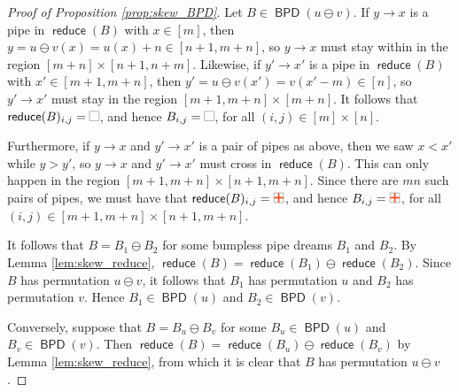 \documentclass[11pt]{article}
\theoremstyle{definition}
\numberwithin{equation}{section}
\DeclareMathOperator{\reduce}{\mathsf{reduce}}
\DeclareMathOperator{\BPD}{\mathsf{BPD}}
\newcommand{\pipecolor}{UForange}
\newcommand{\tilescale}{0.27}
\newcommand{\drawSquare}{
    \draw[
        xshift=0.5cm,yshift=0.5cm,
        black,opacity=0.5,thin
    ] (0,0) rectangle (1,1);
}
\newcommand{\drawHorizontal}[2]{
    \draw[color=\pipecolor,very thick]
    (#1-0.5,#2) to (#1+0.5,#2);
}
\newcommand{\drawVertical}[2]{
    \draw[color=\pipecolor,very thick]
    (#1,#2-0.5) to (#1,#2+0.5);
}
\newcommand{\drawCross}[2]{
    \drawHorizontal{#1}{#2}
    \drawVertical{#1}{#2}
}
\newcommand{\blank}[1][scale=\tilescale,baseline=4pt]{
    \begin{tikzpicture}[#1]
    \drawSquare
    \end{tikzpicture}
}
\newcommand{\cross}[1][scale=\tilescale,baseline=4pt]{
    \begin{tikzpicture}[#1]
    \drawSquare
    \drawCross11
    \end{tikzpicture}
}
\begin{document}
\begin{proof}[Proof of Proposition \ref{prop:skew_BPD}]
Let $B\in \BPD(u\ominus v)$.
If $y\to x$ is a pipe in $\reduce(B)$ with $x\in [m]$, then $y = u\ominus v(x) = u(x)+n \in [n+1,m+n]$, so $y\to x$ must stay within in the region $[m+n]\times[n+1,n+m]$.
Likewise, if $y'\to x'$ is a pipe in $\reduce(B)$ with $x'\in [m+1,m+n]$, then $y' = u\ominus v(x') = v(x'-m) \in [n]$, so $y'\to x'$ must stay in the region $[m+1,m+n]\times [m+n]$.
It follows that $\reduce(B)_{i,j} = \blank$, and hence $B_{i,j} = \blank$, for all $(i,j)\in [m]\times [n]$.

Furthermore, if $y\to x$ and $y'\to x'$ is a pair of pipes as above, then we saw $x < x'$ while $y > y'$, so $y\to x$ and $y'\to x'$ must cross in $\reduce(B)$.
This can only happen in the region $[m+1,m+n]\times [n+1,m+n]$.
Since there are $mn$ such pairs of pipes, we must have that $\reduce(B)_{i,j} = \cross$, and hence $B_{i,j} = \cross$, for all $(i,j)\in [m+1,m+n]\times [n+1,m+n]$.

It follows that $B = B_1\ominus B_2$ for some bumpless pipe dreams $B_1$ and $B_2$.
By Lemma \ref{lem:skew_reduce}, $\reduce(B) = \reduce(B_1)\ominus \reduce(B_2)$.
Since $B$ has permutation $u\ominus v$, it follows that $B_1$ has permutation $u$ and $B_2$ has permutation $v$.
Hence $B_1\in \BPD(u)$ and $B_2\in \BPD(v)$.

Conversely, suppose that $B = B_u\ominus B_v$ for some $B_u\in \BPD(u)$ and $B_v\in \BPD(v)$.
Then $\reduce(B) = \reduce(B_u)\ominus \reduce(B_v)$ by Lemma \ref{lem:skew_reduce}, from which it is clear that $B$ has permutation $u\ominus v$.
\end{proof}
\end{document}
